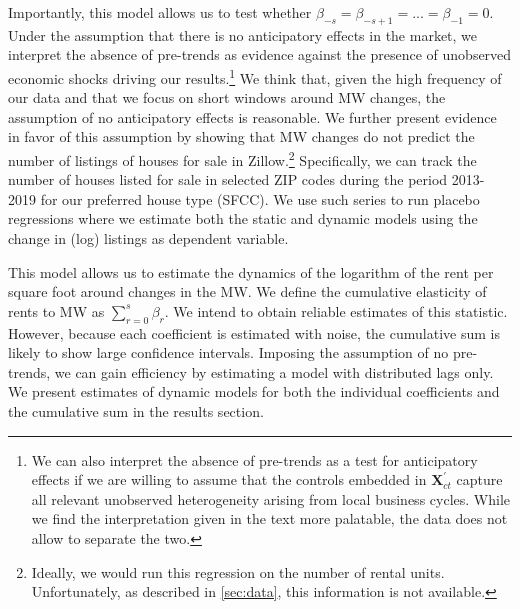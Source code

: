 Importantly, this model allows us to test whether $\beta_{-s} = \beta_{-s+1} = ... = \beta_{-1} 
= 0$. Under the assumption that there is no anticipatory effects in the market, we interpret the 
absence of pre-trends as evidence against the presence of unobserved economic shocks driving our 
results.\footnote{We can also interpret the absence of pre-trends as a test for anticipatory
	effects if we are willing to assume that the controls embedded in $\mathbf{X}^{'}_{ct}$ 
	capture all relevant unobserved heterogeneity arising from local business cycles. While we 
	find the interpretation given in the text more palatable, the data does not allow to separate 
	the two.} 
We think that, given the high frequency of our data and that we focus on short windows around MW 
changes, the assumption of no anticipatory effects is reasonable. We further present evidence in 
favor of this assumption by showing that MW changes do not predict the number of listings of 
houses for sale in Zillow.\footnote{Ideally, we would run this regression on the number of rental 
	units. Unfortunately, as described in \autoref{sec:data}, this information is not available.}
Specifically, we can track the number of houses listed for sale in selected ZIP codes during the 
period 2013-2019 for our preferred house type (SFCC). We use such series to run placebo 
regressions where we estimate both the static and dynamic models using the change in (log) 
listings as dependent variable. %

This model allows us to estimate the dynamics of the logarithm of the rent per square foot around 
changes in the MW. We define the cumulative elasticity of rents to MW as $\sum_{r=0}^s \beta_r$. 
We intend to obtain reliable estimates of this statistic. However, because each coefficient is 
estimated with noise, the cumulative sum is likely to show large confidence intervals. Imposing 
the assumption of no pre-trends, we can gain efficiency by estimating a model with distributed 
lags only. We present estimates of dynamic models for both the individual coefficients and the 
cumulative sum in the results section.


